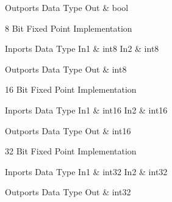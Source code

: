 \begin{XtoCtabular}{Outports Data Type}
Out & bool\tabularnewline
\hline
\end{XtoCtabular}

\ifdefined \AddTestReports
{}
\fi
{}
\nopagebreak[0]

8 Bit Fixed Point Implementation

\begin{XtoCtabular}{Inports Data Type}
In1 & int8\tabularnewline
\hline
In2 & int8\tabularnewline
\hline
\end{XtoCtabular}

\begin{XtoCtabular}{Outports Data Type}
Out & int8\tabularnewline
\hline
\end{XtoCtabular}

\ifdefined \AddTestReports
{}
\fi
{}
\nopagebreak[0]

16 Bit Fixed Point Implementation

\begin{XtoCtabular}{Inports Data Type}
In1 & int16\tabularnewline
\hline
In2 & int16\tabularnewline
\hline
\end{XtoCtabular}

\begin{XtoCtabular}{Outports Data Type}
Out & int16\tabularnewline
\hline
\end{XtoCtabular}

\ifdefined \AddTestReports
{}
\fi
{}
\nopagebreak[0]

32 Bit Fixed Point Implementation

\begin{XtoCtabular}{Inports Data Type}
In1 & int32\tabularnewline
\hline
In2 & int32\tabularnewline
\hline
\end{XtoCtabular}

\begin{XtoCtabular}{Outports Data Type}
Out & int32\tabularnewline
\hline
\end{XtoCtabular}

\ifdefined \AddTestReports
{}
\fi
{}
\nopagebreak[0]


